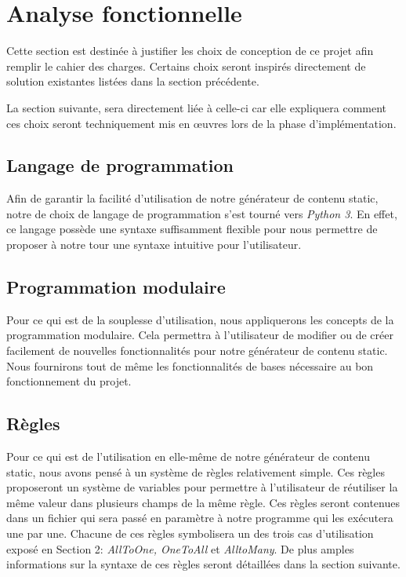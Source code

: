 \section{Analyse fonctionnelle}

	Cette section est destinée à justifier les choix de conception de ce projet afin remplir le cahier des charges. Certains choix seront inspirés directement de solution existantes listées dans la section précédente.
	
	La section suivante, sera directement liée à celle-ci car elle expliquera comment ces choix seront techniquement mis en œuvres lors de la phase d'implémentation.

	\subsection{Langage de programmation}
		Afin de garantir la facilité d'utilisation de notre générateur de contenu static, notre de choix de langage de programmation s'est tourné vers \textit{Python 3}. En effet, ce langage possède une syntaxe suffisamment flexible pour nous permettre de proposer à notre tour une syntaxe intuitive pour l'utilisateur.
		
	\subsection{Programmation modulaire}
		Pour ce qui est de la souplesse d'utilisation, nous appliquerons les concepts de la programmation modulaire. Cela permettra à l'utilisateur de modifier ou de créer facilement de nouvelles fonctionnalités pour notre générateur de contenu static. Nous fournirons tout de même les fonctionnalités de bases nécessaire au bon fonctionnement du projet.

	\subsection{Règles}
		Pour ce qui est de l'utilisation en elle-même de notre générateur de contenu static, nous avons pensé à un système de règles relativement simple. Ces règles proposeront un système de variables pour permettre à l'utilisateur de réutiliser la même valeur dans plusieurs champs de la même règle. Ces règles seront contenues dans un fichier qui sera passé en paramètre à notre programme qui les exécutera une par une. Chacune de ces règles symbolisera un des trois cas d'utilisation exposé en Section 2: \textit{AllToOne, OneToAll} et \textit{AlltoMany}. De plus amples informations sur la syntaxe de ces règles seront détaillées dans la section suivante.
	
